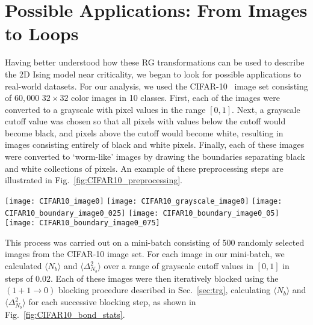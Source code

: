 \documentclass[../main.tex]{subfiles}
\begin{document}
\section{Possible Applications: From Images to Loops}%
\label{sec:cifar} 
Having better understood how these RG transformations can be used to describe
the 2D Ising model near criticality, we began to look for possible applications
to real-world datasets.
%
For our analysis, we used the CIFAR-10~\cite{Krizhevsky09} image set consisting
of $60,000$ $32\times32$ color images in 10 classes.
%
First, each of the images were converted to a grayscale with pixel values in
the range $[0, 1]$.
%
Next, a grayscale cutoff value was chosen so that all pixels with values below
the cutoff would become black, and pixels above the cutoff would become white,
resulting in images consisting entirely of black and white pixels.
%
Finally, each of these images were converted to `worm-like' images by drawing
the boundaries separating black and white collections of pixels.
%
An example of these preprocessing steps are illustrated in
Fig.~\ref{fig:CIFAR10_preprocessing}.
%
\begin{figure*}[htpb]
 \centering
 \texttt{[image: CIFAR10\_image0]}
 \hspace{1.5cm}
 \texttt{[image: CIFAR10\_grayscale\_image0]}
 \texttt{[image: CIFAR10\_boundary\_image0\_025]}
 \hfill
 \texttt{[image: CIFAR10\_boundary\_image0\_05]}
 \hfill
 \texttt{[image: CIFAR10\_boundary\_image0\_075]}
 \caption{Example of preprocessing steps for converting CIFAR-10 images to
		`worm-like' images, illustrating the resulting image for different values
		of the grayscale cuttoff. (a) Original image from CIFAR-10 dataset. (b)
		Image converted to grayscale.  (c) Resulting image from cutoff values of
		$0.25$, (d) $0.5$, and (e) $0.75$.}%
\label{fig:CIFAR10_preprocessing} 
\end{figure*}
%
%
This process was carried out on a mini-batch consisting of 500 randomly
selected images from the CIFAR-10 image set.
%
For each image in our mini-batch, we calculated $\langle N_b\rangle$ and
$\langle \Delta_{N_b}^2\rangle$ over a range of grayscale cutoff values in $[0,
1]$ in steps of $0.02$.
%
Each of these images were then iteratively blocked using the $(1 + 1
\rightarrow 0)$ blocking procedure described in Sec.~\ref{sec:trg}, calculating
$\langle N_b\rangle$ and $\langle \Delta_{N_b}^2\rangle$ for each successive
blocking step, as shown in Fig.~\ref{fig:CIFAR10_bond_stats}.
\end{document}
